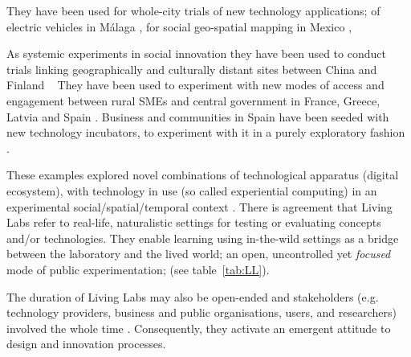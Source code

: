 \documentclass[graybox]{styles/svmult}
\begin{document}
They have been used for whole-city trials of new technology applications; of electric vehicles in Málaga \citep{carillo2013smartcity}, for social geo-spatial mapping in Mexico \citep{sandoval2017open}, 

As systemic experiments in social innovation they have been used to conduct trials linking geographically and culturally distant sites between China and Finland ~\citep{tang2012internationally} 
They have been used to experiment with new modes of access and engagement between rural SMEs and central government in France, Greece, Latvia and Spain \cite{luccini2010egovtube}. 
Business and communities in Spain have been seeded with new technology incubators, to experiment with it in a purely exploratory fashion \citep{gasco2017living}. 

These examples explored novel combinations of technological apparatus (digital ecosystem), with technology in use (so called experiential computing) in an experimental social/spatial/temporal context \citep{nystrom2014actor}.
There is agreement that Living Labs refer to real-life, naturalistic settings for testing or evaluating concepts and/or technologies. 
They enable learning using in-the-wild settings as a bridge between the laboratory and the lived world; an open, uncontrolled yet \textit{focused} mode of public experimentation; (see table~\ref{tab:LL}). 

The duration of Living Labs may also be open-ended and stakeholders (e.g. technology providers, business and public organisations, users, and researchers) involved the whole time \citep{niitamo2006state}. 
Consequently, they activate an emergent attitude to design and innovation processes. 
\end{document}
